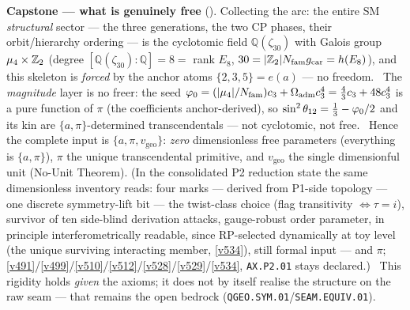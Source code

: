 
\par\smallskip\noindent\textbf{Capstone --- what is genuinely free} ().
Collecting the arc: the entire SM \emph{structural} sector --- the three generations, the two CP phases, their
orbit/hierarchy ordering --- is the cyclotomic field $\mathbb Q(\zeta_{30})$ with Galois group $\mu_4\times\mathbb Z_2$
(degree $[\mathbb Q(\zeta_{30}){:}\mathbb Q]=8=$ rank $E_8$, $30=|\mathbb Z_2|N_{\mathrm{fam}}g_{\mathrm{car}}=h(E_8)$), and this skeleton is
\emph{forced} by the anchor atoms $\{2,3,5\}=e(a)$ --- no freedom. \mE\ The \emph{magnitude} layer is no freer: the
seed $\varphi_0=(|\mu_4|/N_{\mathrm{fam}})c_3+\Omega_{\mathrm{adm}}c_3^4=\tfrac43c_3+48c_3^4$ is a pure function of
$\pi$ (the coefficients anchor-derived), so $\sin^2\theta_{12}=\tfrac13-\varphi_0/2$ and its kin are
$\{a,\pi\}$-determined transcendentals --- not cyclotomic, not free. \mE\ Hence the complete input is
$\{a,\pi,v_{\mathrm{geo}}\}$: \emph{zero} dimensionless free parameters (everything is $\{a,\pi\}$), $\pi$ the unique
transcendental primitive, and $v_{\mathrm{geo}}$ the single dimensionful unit (No-Unit Theorem). (In the
consolidated P2 reduction state the same dimensionless inventory reads: four marks --- derived from
P1-side topology --- one discrete symmetry-lift bit --- the twist-class choice (flag transitivity
$\iff\tau=i$), survivor of ten side-blind derivation attacks, gauge-robust order parameter, in
principle interferometrically readable, since RP-selected dynamically at toy level (the unique
surviving interacting member, \vref{v534}), still formal input --- and $\pi$;
\vref{v491}/\vref{v499}/\vref{v510}/\vref{v512}/\vref{v528}/\vref{v529}/\vref{v534},
\texttt{AX.P2.01} stays declared.) \mO\ This rigidity
holds \emph{given} the axioms; it does not by itself realise the structure on the raw seam --- that remains the open
bedrock (\texttt{QGEO.SYM.01}/\texttt{SEAM.EQUIV.01}).

